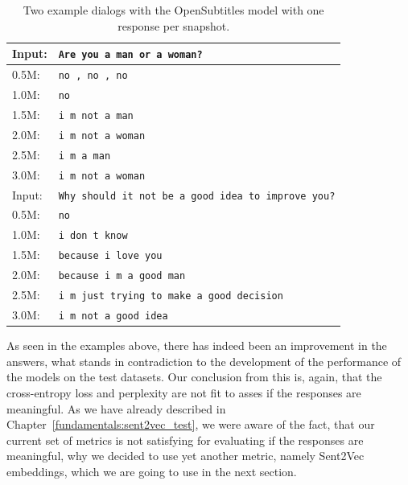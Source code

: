 \begin{table}[H]
	\centering
	\begin{adjustbox}{max width=\textwidth}
		\begin{tabular}{ll}
			\toprule
			Input: 	& \texttt{Are you a man or a woman?}\\
			\midrule
			0.5M: 	& \texttt{no , no , no}\\
			1.0M: 	& \texttt{no}\\
			1.5M:	& \texttt{i m not a man}\\
			2.0M:	& \texttt{i m not a woman}\\
			2.5M:	& \texttt{i m a man}\\
			3.0M:	& \texttt{i m not a woman}\\
			\midrule
			Input: 	& \texttt{Why should it not be a good idea to improve you?}\\
			\midrule
			0.5M: 	& \texttt{no}\\
			1.0M: 	& \texttt{i don t know}\\
			1.5M:	& \texttt{because i love you}\\
			2.0M:	& \texttt{because i m a good man}\\
			2.5M:	& \texttt{i m just trying to make a good decision}\\
			3.0M:	& \texttt{i m not a good idea}\\
			\bottomrule
		\end{tabular}
	\end{adjustbox}
	\caption{Two example dialogs with the OpenSubtitles model with one response per snapshot.}
	\label{results:example_output:opensubtitles}
\end{table}

As seen in the examples above, there has indeed been an improvement in the answers, what stands in contradiction to the development of the performance of the models on the test datasets. Our conclusion from this is, again, that the cross-entropy loss and perplexity are not fit to asses if the responses are meaningful. As we have already described in Chapter~\ref{fundamentals:sent2vec_test}, we were aware of the fact, that our current set of metrics is not satisfying for evaluating if the responses are meaningful, why we decided to use yet another metric, namely Sent2Vec embeddings, which we are going to use in the next section.

